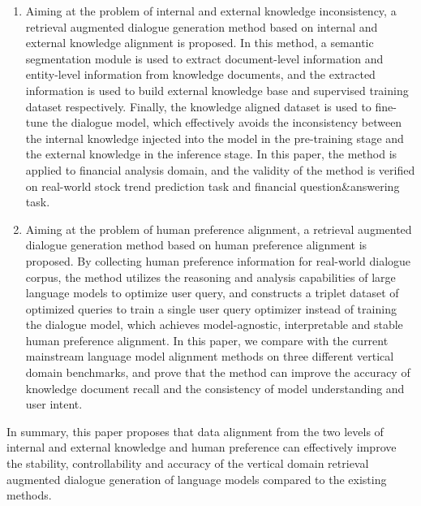 \begin{enumerate}[topsep = 0 pt, itemsep= 0 pt, parsep=0pt, partopsep=0pt, leftmargin=0pt, itemindent=44pt, labelsep=6pt, listparindent=24pt, label=\arabic*)]
	\item Aiming at the problem of internal and external knowledge inconsistency, a retrieval augmented dialogue generation method based on internal and external knowledge alignment is proposed. In this method, a semantic segmentation module is used to extract document-level information and entity-level information from knowledge documents, and the extracted information is used to build external knowledge base and supervised training dataset respectively. Finally, the knowledge aligned dataset is used to fine-tune the dialogue model, which effectively avoids the inconsistency between the internal knowledge injected into the model in the pre-training stage and the external knowledge in the inference stage. In this paper, the method is applied to financial analysis domain, and the validity of the method is verified on real-world stock trend prediction task and financial question\&answering task.

	\item Aiming at the problem of human preference alignment, a retrieval augmented dialogue generation method based on human preference alignment is proposed. By collecting human preference information for real-world dialogue corpus, the method utilizes the reasoning and analysis capabilities of large language models to optimize user query, and constructs a triplet dataset of optimized queries to train a single user query optimizer instead of training the dialogue model, which achieves model-agnostic, interpretable and stable human preference alignment. In this paper, we compare with the current mainstream language model alignment methods on three different vertical domain benchmarks, and prove that the method can improve the accuracy of knowledge document recall and the consistency of model understanding and user intent.
\end{enumerate}

In summary, this paper proposes that data alignment from the two levels of internal and external knowledge and human preference can effectively improve the stability, controllability and accuracy of the vertical domain retrieval augmented dialogue generation of language models compared to the existing methods.

